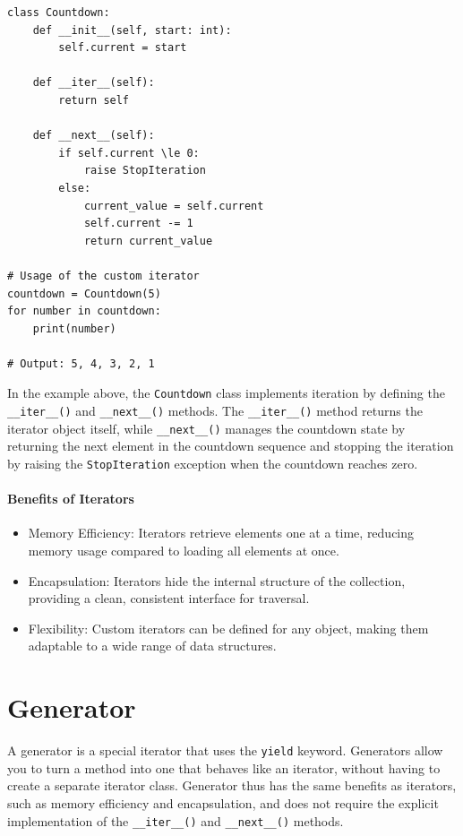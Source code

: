 \documentclass[oneside,11pt,dvipsnames]{book}
\newcommand{\code}[1]{\texttt{#1}}
\begin{document}
\begin{lstlisting}[multicols=2]
class Countdown:
    def __init__(self, start: int):
        self.current = start

    def __iter__(self): 
        return self

    def __next__(self):
        if self.current \le 0:
            raise StopIteration 
        else:
            current_value = self.current
            self.current -= 1
            return current_value

# Usage of the custom iterator
countdown = Countdown(5)
for number in countdown:
    print(number)

# Output: 5, 4, 3, 2, 1
\end{lstlisting}

In the example above, the \code{Countdown} class implements iteration by defining the \code{\_\_iter\_\_()} and \code{\_\_next\_\_()} methods. The \code{\_\_iter\_\_()} method returns the iterator object itself, while \code{\_\_next\_\_()} manages the countdown state by returning the next element in the countdown sequence and stopping the iteration by raising the \code{StopIteration} exception when the countdown reaches zero.


\paragraph{Benefits of Iterators}
\begin{itemize}
\item Memory Efficiency: Iterators retrieve elements one at a time, reducing memory usage compared to loading all elements at once.
\item Encapsulation: Iterators hide the internal structure of the collection, providing a clean, consistent interface for traversal.
\item Flexibility: Custom iterators can be defined for any object, making them adaptable to a wide range of data structures.
\end{itemize}


\section{Generator}
A generator is a special iterator that uses the \code{yield} keyword. Generators allow you to turn a method into one that behaves like an iterator, without having to create a separate iterator class. Generator thus has the same benefits as iterators, such as memory efficiency and encapsulation, and does not require the explicit implementation of the \code{\_\_iter\_\_()} and \code{\_\_next\_\_()} methods.
\end{document}
